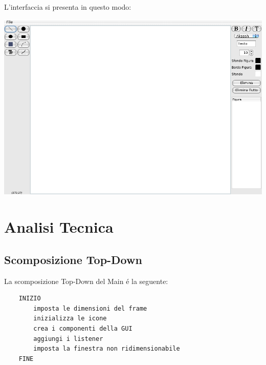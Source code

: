 \documentclass[a4paper,12pt]{article}
\begin{document}
L'interfaccia si presenta in questo modo:\\
\begin{center}
\includegraphics[scale=0.3]{Immagini/GUI.png}
\end{center}

\section{Analisi Tecnica}

\subsection{Scomposizione Top-Down} \label{TopDown}
La scomposizione Top-Down del Main é la seguente:
\begin{lstlisting}
	INIZIO
		imposta le dimensioni del frame
		inizializza le icone
		crea i componenti della GUI
		aggiungi i listener
		imposta la finestra non ridimensionabile
	FINE
\end{lstlisting}
\end{document}
